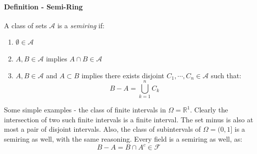 \documentclass[12pt,a4paper]{article}
\newcommand{\1}[1]{\mathbbm{1}\left\{ #1 \right\}}
\newcommand{\R}{\mathbb{R}}
\newcommand{\acal}{\mathcal{A}}
\newcommand{\fcal}{\mathcal{F}}
\begin{document}
\paragraph{Definition - Semi-Ring} A class of sets $\acal$ is a \textit{semiring} if:
\begin{enumerate}
	\item $\emptyset \in \acal$
	\item $A, B \in \acal$ implies $A \cap B \in \acal$
	\item $A, B \in \acal$ and $A \subset B$ implies there exists disjoint $C_1, \cdots, C_n \in \acal$ such that:
	$$
		B - A = \bigcup_{k=1}^n C_k
	$$
\end{enumerate}
Some simple examples - the class of finite intervals in $\Omega = \R^1$. Clearly the intersection of two such finite intervals is a finite interval. The set minus is also at most a pair of disjoint intervals. Also, the class of subintervals of $\Omega = (0,1]$ is a semiring as well, with the same reasoning. Every field is a semiring as well, as:
$$
	B - A = B \cap A^c \in \fcal
$$
\end{document}
